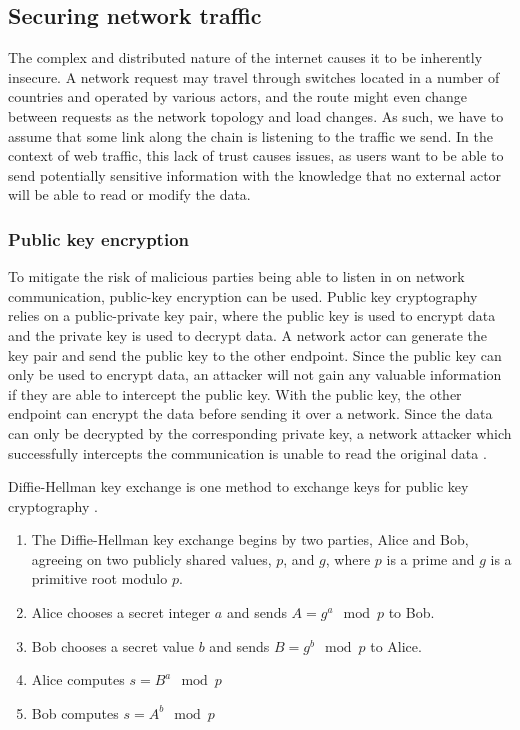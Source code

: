 \subsection{Securing network traffic}
The complex and distributed nature of the internet causes it to be inherently insecure. A network request may travel through switches located in a number of countries and operated by various actors, and the route might even change between requests as the network topology and load changes. As such, we have to assume that some link along the chain is listening to the traffic we send. In the context of web traffic, this lack of trust causes issues, as users want to be able to send potentially sensitive information with the knowledge that no external actor will be able to read or modify the data.

\subsubsection{Public key encryption}
To mitigate the risk of malicious parties being able to listen in on network communication, public-key encryption can be used.
Public key cryptography relies on a public-private key pair, where the public key is used to encrypt data and the private key is used to decrypt data.
A network actor can generate the key pair and send the public key to the other endpoint.
Since the public key can only be used to encrypt data, an attacker will not gain any valuable information if they are able to intercept the public key.
With the public key, the other endpoint can encrypt the data before sending it over a network.
Since the data can only be decrypted by the corresponding private key, a network attacker which successfully intercepts the communication is unable to read the original data \citep{hellman_overview_1978}.

Diffie-Hellman key exchange is one method to exchange keys for public key cryptography \citep{diffie_new_1976}  \citep{gillmor_negotiated_2016}.
\begin{enumerate}
    \item The Diffie-Hellman key exchange begins by two parties, Alice and Bob, agreeing on two publicly shared values, $p$, and $g$, where $p$ is a prime and $g$ is a primitive root modulo $p$.
    \item Alice chooses a secret integer $a$ and sends $A = g^a \mod p$ to Bob.
    \item Bob chooses a secret value $b$ and sends $B = g^b \mod p$ to Alice.
    \item Alice computes $s = B^a \mod p$
    \item Bob computes $s = A^b \mod p$
\end{enumerate}

